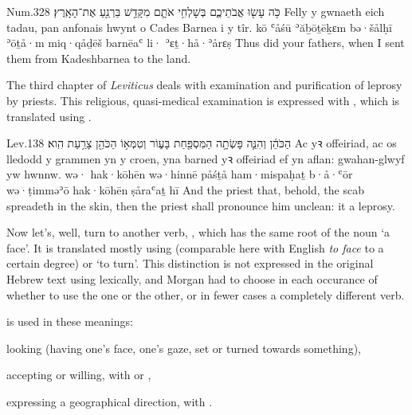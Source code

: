 \begin{example}{Num.}{32}{8}{}{}
	\quoling
	{כֹּ֥ה עָשׂ֖וּ אֲבֹתֵיכֶ֑ם בְּשָׁלְחִ֥י אֹתָ֛ם מִקָּדֵ֥שׁ בַּרְנֵ֖עַ  אֶת־הָאָֽרֶץ׃}
	{Felly y gwnaeth eich tadau, pan anfonais hwynt o Cades Barnea i  y tîr.}
	{kō ʿåśū ʾăḇōṯēḵɛm bə·šålḥī ʾōṯå·m miq·qåḏēš barnēaʿ li· ʾɛṯ·hå·ʾårɛṣ}
	{Thus did your fathers, when I sent them from Kadeshbarnea to  the land.}
\end{example}




\begin{paper}
	The third chapter of \emph{Leviticus} deals with examination and purification of leprosy by priests. This religious, quasi-medical examination is expressed with , which is translated using .
\end{paper}

\begin{example}{Lev.}{13}{8}{}{}
	\quoling
	{ הַכֹּהֵ֔ן וְהִנֵּ֛ה פָּשְׂתָ֥ה הַמִּסְפַּ֖חַת בָּע֑וֹר וְטִמְּא֥וֹ הַכֹּהֵ֖ן צָרַ֥עַת הִֽוא׃}
	{Ac  yꝛ offeiriad, ac os lledodd y grammen yn y croen, yna barned yꝛ offeiriad ef yn aflan: gwahan-glwyf yw hwnnw.}
	{wə· hak·kōhēn wə·hinnē påśṯå ham·mispaḥaṯ b·å·ʿōr wə·ṭimməʾō hak·kōhēn ṣåraʿaṯ hī}
	{And  the priest  that, behold, the scab spreadeth in the skin, then the priest shall pronounce him unclean: it  a leprosy.}
\end{example}






\begin{paper}
	Now let’s, well, turn to another verb, , which has the same root of the noun  ‘a face’. It is translated mostly using  (comparable here with English \textit{to face} to a certain degree) or  ‘to turn’. This distinction is not expressed in the original Hebrew text using lexically, and Morgan had to choose in each occurance of  whether to use the one or the other, or in fewer cases a completely different verb.
\end{paper}

\begin{paper}
	 is used in these meanings:
	\begin{compactitem}
		\item looking (having one’s face, one’s gaze, set or turned towards something),
		\item accepting or willing, with  or ,
		\item expressing a geographical direction, with .
	\end{compactitem}
\end{paper}

